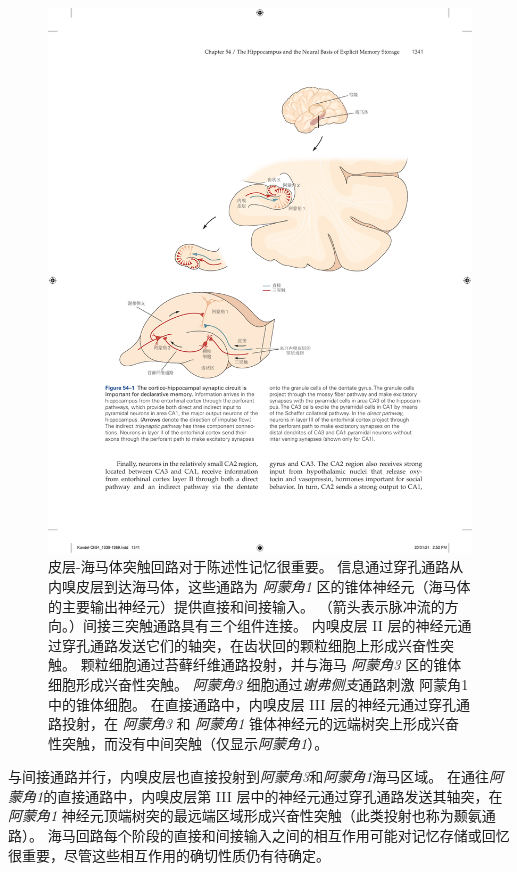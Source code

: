 \begin{figure}[htbp]
	\centering
	\includegraphics[width=1.0\linewidth]{chap54/fig_54_1}
	\caption{皮层-海马体突触回路对于陈述性记忆很重要。
		信息通过穿孔通路从内嗅皮层到达海马体，这些通路为 \textit{阿蒙角1} 区的锥体神经元（海马体的主要输出神经元）提供直接和间接输入。
		（箭头表示脉冲流的方向。）间接三突触通路具有三个组件连接。
		内嗅皮层 II 层的神经元通过穿孔通路发送它们的轴突，在齿状回的颗粒细胞上形成兴奋性突触。
		颗粒细胞通过苔藓纤维通路投射，并与海马 \textit{阿蒙角3} 区的锥体细胞形成兴奋性突触。
		\textit{阿蒙角3} 细胞通过\textit{谢弗侧支}通路刺激 阿蒙角1 中的锥体细胞。
		在直接通路中，内嗅皮层 III 层的神经元通过穿孔通路投射，在 \textit{阿蒙角3} 和 \textit{阿蒙角1} 锥体神经元的远端树突上形成兴奋性突触，而没有中间突触（仅显示\textit{阿蒙角1}）。}
	\label{fig:54_1}
\end{figure}


与间接通路并行，内嗅皮层也直接投射到\textit{阿蒙角3}和\textit{阿蒙角1}海马区域。
在通往\textit{阿蒙角1}的直接通路中，内嗅皮层第 III 层中的神经元通过穿孔通路发送其轴突，在\textit{阿蒙角1} 神经元顶端树突的最远端区域形成兴奋性突触（此类投射也称为颞氨通路）。
海马回路每个阶段的直接和间接输入之间的相互作用可能对记忆存储或回忆很重要，尽管这些相互作用的确切性质仍有待确定。



